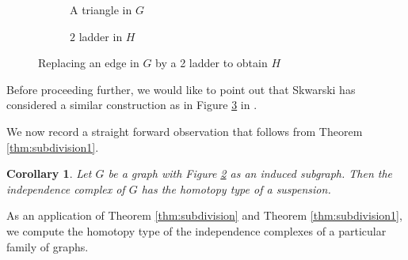 \documentclass[12pt]{article}
\newtheorem{cor}[thm]{Corollary}
\numberwithin{thm}{section}
\theoremstyle{definition}
\begin{document}
\begin{figure}[H]
	\begin{subfigure}[]{0.45 \textwidth}
		\centering
		\caption{A triangle in $G$}\label{triangle}
	\end{subfigure}
	\begin{subfigure}[]{0.45 \textwidth}
		\centering
		\caption{$2$ ladder in $H$} \label{ladder1}
	\end{subfigure}
	\caption{Replacing an edge in $G$ by a 2 ladder to obtain $H$} \label{fig:subdivision2}
\end{figure}


Before proceeding further, we would like to point out that Skwarski has considered a similar construction as in Figure \ref{fig:subdivision2} in \cite[Section 3.3.1]{JS10}.


We now record a straight forward observation that follows from Theorem \ref{thm:subdivision1}.


\begin{cor} Let $G$ be a graph with Figure \ref{ladder1} as an induced subgraph. Then the independence complex of $G$ has the homotopy type of a suspension.
\end{cor}

As an application of Theorem \ref{thm:subdivision} and Theorem \ref{thm:subdivision1}, we compute the  homotopy type of the independence complexes of a particular family of graphs.
\end{document}
